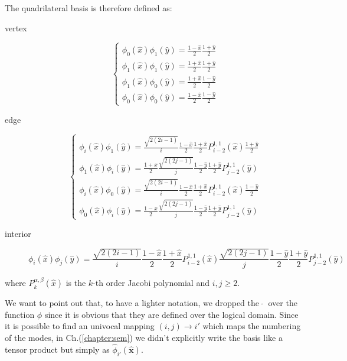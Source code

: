 The quadrilateral basis is therefore defined as:
\begin{description}
 \item[vertex]
   \begin{equation}
      \begin{cases}
	\phi_0(\hat{x})\phi_1(\hat{y})=\frac{1-\hat{x}}{2}\frac{1+\hat{y}}{2}\\
	\phi_1(\hat{x})\phi_1(\hat{y})=\frac{1+\hat{x}}{2}\frac{1+\hat{y}}{2}\\
	\phi_1(\hat{x})\phi_0(\hat{y})=\frac{1+\hat{x}}{2}\frac{1-\hat{y}}{2}\\
	\phi_0(\hat{x})\phi_0(\hat{y})=\frac{1-\hat{x}}{2}\frac{1-\hat{y}}{2}
      \end{cases}
   \end{equation}
  \item[edge]
    \begin{equation}
	\begin{cases}
	  \phi_i(\hat{x})\phi_1(\hat{y})=\frac{\sqrt{2(2i-1)}}{i}\frac{1-\hat{x}}{2}\frac{1+\hat{x}}{2}P^{1,1}_{i-2}(\hat{x})\frac{1+\hat{y}}{2}\\
	  \phi_1(\hat{x})\phi_i(\hat{y})=\frac{1+\hat{x}}{2}\frac{\sqrt{2(2j-1)}}{j}\frac{1-\hat{y}}{2}\frac{1+\hat{y}}{2}P^{1,1}_{j-2}(\hat{y})\\
	  \phi_i(\hat{x})\phi_0(\hat{y})=\frac{\sqrt{2(2i-1)}}{i}\frac{1-\hat{x}}{2}\frac{1+\hat{x}}{2}P^{1,1}_{i-2}(\hat{x})\frac{1-\hat{y}}{2}\\
	  \phi_0(\hat{x})\phi_i(\hat{y})=\frac{1-\hat{x}}{2}\frac{\sqrt{2(2j-1)}}{j}\frac{1-\hat{y}}{2}\frac{1+\hat{y}}{2}P^{1,1}_{j-2}(\hat{y})
	\end{cases}
    \end{equation}
  \item[interior]
    \begin{equation}
      \phi_i(\hat{x})\phi_j(\hat{y})=\frac{\sqrt{2(2i-1)}}{i}\frac{1-\hat{x}}{2}\frac{1+\hat{x}}{2}P^{1,1}_{i-2}(\hat{x})\frac{\sqrt{2(2j-1)}}{j}\frac{1-\hat{y}}{2}\frac{1+\hat{y}}{2}P^{1,1}_{j-2}(\hat{y})
    \end{equation}
\end{description}
where $P^{\alpha,\beta}_k(\hat{x})$ is the $k$-th order Jacobi polynomial and $i,j\geq 2$.
\medskip

We want to point out that, to have a lighter notation, we dropped the $\:\hat{}\:$ over the function $\phi$ since it is obvious that they are defined over the logical domain. Since it is possible to find an univocal mapping $(i,j)\longrightarrow i'$ which maps the numbering of the modes, in Ch.(\ref{chapter:sem}) we didn't explicitly write the basis like a tensor product but simply as $\hat{\phi}_{i'}(\mathbf{\hat{x}})$.

